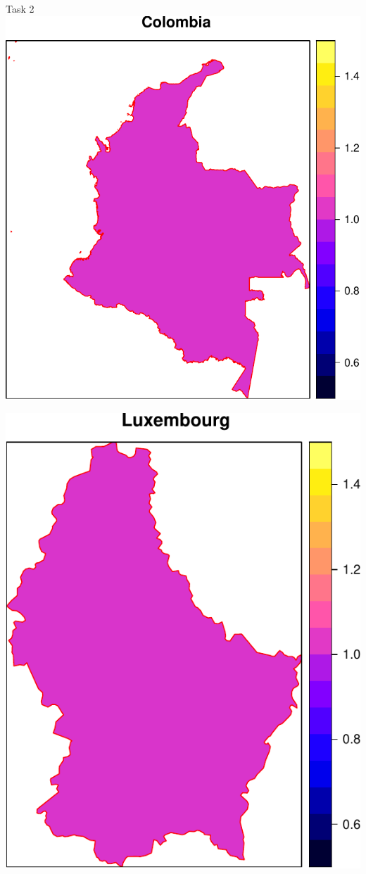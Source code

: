 \documentclass[
  ignorenonframetext,
  aspectratio=169,
]{beamer}
\begin{document}
\begin{frame}[fragile]{Task 2}
\includegraphics{global_n_files/figure-beamer/unnamed-chunk-8-1.pdf}

\includegraphics{global_n_files/figure-beamer/unnamed-chunk-8-2.pdf}


\end{frame}
\end{document}

